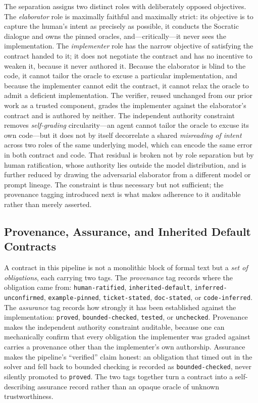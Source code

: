 The separation assigns two distinct roles with deliberately opposed objectives. The \emph{elaborator} role is maximally faithful and maximally strict: its objective is to capture the human's intent as precisely as possible, it conducts the Socratic dialogue and owns the pinned oracles, and---critically---it never sees the implementation. The \emph{implementer} role has the narrow objective of satisfying the contract handed to it; it does not negotiate the contract and has no incentive to weaken it, because it never authored it. Because the elaborator is blind to the code, it cannot tailor the oracle to excuse a particular implementation, and because the implementer cannot edit the contract, it cannot relax the oracle to admit a deficient implementation. The verifier, reused unchanged from our prior work as a trusted component, grades the implementer against the elaborator's contract and is authored by neither. The independent authority constraint removes \emph{self-grading} circularity---an agent cannot tailor the oracle to excuse its own code---but it does not by itself decorrelate a shared \emph{misreading of intent} across two roles of the same underlying model, which can encode the same error in both contract and code. That residual is broken not by role separation but by human ratification, whose authority lies outside the model distribution, and is further reduced by drawing the adversarial elaborator from a different model or prompt lineage. The constraint is thus necessary but not sufficient; the provenance tagging introduced next is what makes adherence to it auditable rather than merely asserted.

\subsection{Provenance, Assurance, and Inherited Default Contracts}
\label{subsec:inherited_defaults}

A contract in this pipeline is not a monolithic block of formal text but a \emph{set of obligations}, each carrying two tags. The \emph{provenance} tag records where the obligation came from: \texttt{human-ratified}, \texttt{inherited-default}, \texttt{inferred-unconfirmed}, \texttt{example-pinned}, \texttt{ticket-stated}, \texttt{doc-stated}, or \texttt{code-inferred}. The \emph{assurance} tag records how strongly it has been established against the implementation: \texttt{proved}, \texttt{bounded-checked}, \texttt{tested}, or \texttt{unchecked}. Provenance makes the independent authority constraint auditable, because one can mechanically confirm that every obligation the implementer was graded against carries a provenance other than the implementer's own authorship. Assurance makes the pipeline's ``verified'' claim honest: an obligation that timed out in the solver and fell back to bounded checking is recorded as \texttt{bounded-checked}, never silently promoted to \texttt{proved}. The two tags together turn a contract into a self-describing assurance record rather than an opaque oracle of unknown trustworthiness.

